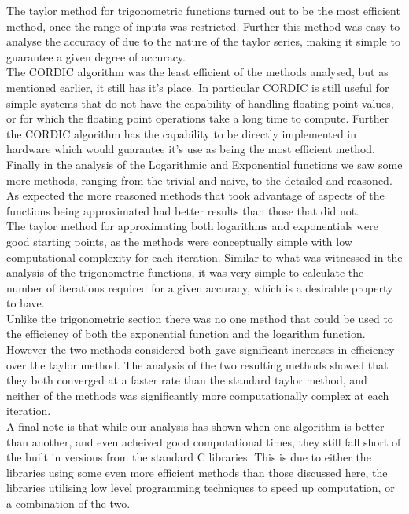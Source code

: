 The taylor method for trigonometric functions turned out to be the most efficient method, once the range of inputs was restricted. Further this method was easy to analyse the accuracy of due to the nature of the taylor series, making it simple to guarantee a given degree of accuracy.\\

The CORDIC algorithm was the least efficient of the methods analysed, but as mentioned earlier, it still has it's place. In particular CORDIC is still useful for simple systems that do not have the capability of handling floating point values, or for which the floating point operations take a long time to compute. Further the CORDIC algorithm has the capability to be directly implemented in hardware which would guarantee it's use as being the most efficient method.\\

Finally in the analysis of the Logarithmic and Exponential functions we saw some more methods, ranging from the trivial and naive, to the detailed and reasoned. As expected the more reasoned methods that took advantage of aspects of the functions being approximated had better results than those that did not.\\

The taylor method for approximating both logarithms and exponentials were good starting points, as the methods were conceptually simple with low computational complexity for each iteration. Similar to what was witnessed in the analysis of the trigonometric functions, it was very simple to calculate the number of iterations required for a given accuracy, which is a desirable property to have.\\

Unlike the trigonometric section there was no one method that could be used to the efficiency of both the exponential function and the logarithm function. However the two methods considered both gave significant increases in efficiency over the taylor method. The analysis of the two resulting methods showed that they both converged at a faster rate than the standard taylor method, and neither of the methods was significantly more computationally complex at each iteration.\\

A final note is that while our analysis has shown when one algorithm is better than another, and even acheived good computational times, they still fall short of the built in versions from the standard C libraries. This is due to either the libraries using some even more efficient methods than those discussed here, the libraries utilising low level programming techniques to speed up computation, or a combination of the two.
